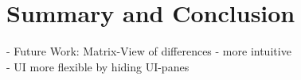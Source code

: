 \documentclass[journal]{style/vgtc} 			          %
\begin{document}
\section{Summary and Conclusion}
- Future Work: Matrix-View of differences - more intuitive\\
- UI more flexible by hiding UI-panes




\end{document}
